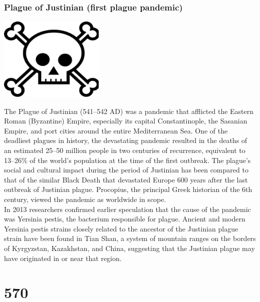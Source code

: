 \documentclass[11pt]{report}
\begin{document}
\section{}
\subsection{Plague of Justinian (first plague pandemic)}
\vspace{2mm}\begin{center}\includegraphics[width=5cm]{./img/skull.jpg}\end{center}
The Plague of Justinian (541–542 AD) was a pandemic that afflicted the Eastern Roman (Byzantine) Empire, especially its capital Constantinople, the Sasanian Empire, and port cities around the entire Mediterranean Sea. One of the deadliest plagues in history, the devastating pandemic resulted in the deaths of an estimated 25–50 million people in two centuries of recurrence, equivalent to 13–26\% of the world's population at the time of the first outbreak. The plague's social and cultural impact during the period of Justinian has been compared to that of the similar Black Death that devastated Europe 600 years after the last outbreak of Justinian plague. Procopius, the principal Greek historian of the 6th century, viewed the pandemic as worldwide in scope.\\
In 2013 researchers confirmed earlier speculation that the cause of the pandemic was Yersinia pestis, the bacterium responsible for plague. Ancient and modern Yersinia pestis strains closely related to the ancestor of the Justinian plague strain have been found in Tian Shan, a system of mountain ranges on the borders of Kyrgyzstan, Kazakhstan, and China, suggesting that the Justinian plague may have originated in or near that region.

\chapter{570}
\section{}
\end{document}
